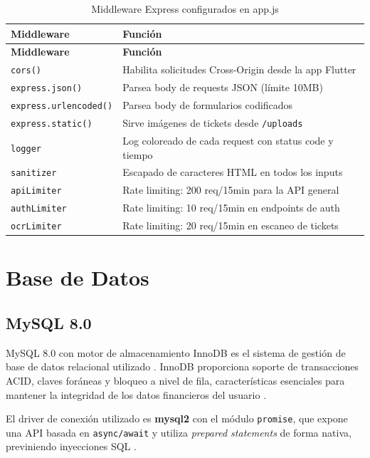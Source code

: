 \begin{longtable}{p{4cm} p{9cm}}
  \caption{Middleware Express configurados en app.js}
  \label{tab:middleware} \\
  \toprule
  \textbf{Middleware} & \textbf{Función} \\
  \midrule
  \endfirsthead
  \toprule
  \textbf{Middleware} & \textbf{Función} \\
  \midrule
  \endhead
  \texttt{cors()} & Habilita solicitudes Cross-Origin desde la app Flutter \\
  \texttt{express.json()} & Parsea body de requests JSON (límite 10MB) \\
  \texttt{express.urlencoded()} & Parsea body de formularios codificados \\
  \texttt{express.static()} & Sirve imágenes de tickets desde \texttt{/uploads} \\
  \texttt{logger} & Log coloreado de cada request con status code y tiempo \\
  \texttt{sanitizer} & Escapado de caracteres HTML en todos los inputs \\
  \texttt{apiLimiter} & Rate limiting: 200 req/15min para la API general \\
  \texttt{authLimiter} & Rate limiting: 10 req/15min en endpoints de auth \\
  \texttt{ocrLimiter} & Rate limiting: 20 req/15min en escaneo de tickets \\
  \bottomrule
\end{longtable}

\section{Base de Datos}

\subsection{MySQL 8.0}

MySQL 8.0 con motor de almacenamiento InnoDB es el sistema de gestión de base de datos relacional utilizado \cite{mysql_docs}. InnoDB proporciona soporte de transacciones ACID, claves foráneas y bloqueo a nivel de fila, características esenciales para mantener la integridad de los datos financieros del usuario \cite{mysql_innodb}.

El driver de conexión utilizado es \textbf{mysql2} con el módulo \texttt{promise}, que expone una API basada en \texttt{async/await} y utiliza \textit{prepared statements} de forma nativa, previniendo inyecciones SQL \cite{mysql2_npm}.

